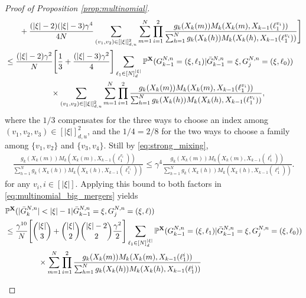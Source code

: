 \documentclass[a4paper,11pt]{article}
\theoremstyle{definition}
\newcommand{\bbP}{\mathbb{P}}
\newcommand{\bfX}{\mathbf{X}}
\begin{document}
\begin{proof}[Proof of Proposition \ref{prop:multinomial}]
\begin{align}
&\phantom{ \leq \times } + \frac{ ( | \xi | - 2 ) ( | \xi | - 3 ) \gamma^4 }{ 4 N }  \sum_{ ( v_1, v_2 ) \in [ | \xi | ]_{ d, u }^2 } \sum_{ m = 1 }^N \prod_{ i = 1 }^2 \frac{ g_k( X_k( m ) ) M_k( X_k( m ), X_{ k - 1 }( \ell_1^{ v_i } ) ) }{ \sum_{ h = 1 }^N g_k( X_k( h ) ) M_k( X_k( h ), X_{ k - 1 }( \ell_1^{ v_i } ) ) } \Bigg] \notag \\
&\leq \frac{ ( | \xi | - 2 ) \gamma^2 }{ N } \Bigg[ \frac{ 1 }{ 3 } + \frac{ ( | \xi | - 3 ) \gamma^2 }{ 4 } \Bigg]  \sum_{ \ell_1 \in [ N ]_d^{ | \xi | } } \bbP^{ \bfX }( G_{ k - 1 }^{ N, n } = ( \xi, \ell_1 ) | \bar{ G }_{ k - 1 }^{ N, n } = \xi, G_j^{ N, n } = ( \xi, \ell_0 ) ) \notag \\
&\phantom{ \leq \frac{ ( | \xi | - 2 ) \gamma^2 }{ N } } \times \sum_{ ( v_1, v_2 ) \in [ | \xi | ]_{ d, u }^2 } \sum_{ m = 1 }^N \prod_{ i = 1 }^2 \frac{ g_k( X_k( m ) ) M_k( X_k( m ), X_{ k - 1 }( \ell_1^{ v_i } ) ) }{ \sum_{ h = 1 }^N g_k( X_k( h ) ) M_k( X_k( h ), X_{ k - 1 }( \ell_1^{ v_i } ) ) }, \label{eq:multinomial_big_mergers}
\end{align}
where the $1/3$ compensates for the three ways to choose an index among $(v_1, v_2, v_3) \in [|\xi|]_{d, u}^2$, and the $1/4 = 2/8$ for the two ways to choose a family among $\{v_1, v_2\}$ and $\{v_3, v_4\}$.
Still by \eqref{eq:strong_mixing},
\begin{align*}
\frac{ g_k( X_k( m ) ) M_k( X_k( m ), X_{ k - 1 }( \ell_1^{ v_i } ) ) }{ \sum_{ h = 1 }^N g_k( X_k( h ) ) M_k( X_k( h ), X_{ k - 1 }( \ell_1^{ v_i } ) ) } \leq \gamma^4 \frac{ g_k( X_k( m ) ) M_k( X_k( m ), X_{ k - 1 }( \ell_1^i ) ) }{ \sum_{ h = 1 }^N g_k( X_k( h ) ) M_k( X_k( h ), X_{ k - 1 }( \ell_1^i ) ) }.
\end{align*}
for any $v_i, i \in [ | \xi | ]$.
Applying this bound to both factors in \eqref{eq:multinomial_big_mergers} yields
\begin{align}
&\bbP^{ \bfX }( | \bar{ G }_k^{ N, n } | < | \xi | - 1 | \bar{ G }_{ k - 1 }^{ N, n } = \xi, G_j^{ N, n } = ( \xi, \ell ) ) \notag \\
&\leq \frac{ \gamma^{ 10 } }{ N } \Bigg[ \binom{ | \xi | }{ 3 }+ \binom{ | \xi | }{ 2 } \binom{  | \xi | - 2 }{ 2 } \frac{ \gamma^2 }{ 2 } \Bigg]  \sum_{ \ell_1 \in [ N ]_d^{ | \xi | } } \bbP^{ \bfX }( G_{ k - 1 }^{ N, n } = ( \xi, \ell_1 ) | \bar{ G }_{ k - 1 }^{ N, n } = \xi, G_j^{ N, n } = ( \xi, \ell_0 ) ) \notag \\
&\phantom{ \leq \sum_{ \ell_1 \in [ N ]_d^{ | \xi | } } } \times \sum_{ m = 1 }^N \prod_{ i = 1 }^2 \frac{ g_k( X_k( m ) ) M_k( X_k( m ), X_{ k - 1 }( \ell_1^i ) ) }{ \sum_{ h = 1 }^N g_k( X_k( h ) ) M_k( X_k( h ), X_{ k - 1 }( \ell_1^i ) ) } \notag \\

\end{align}
\end{proof}
\end{document}
